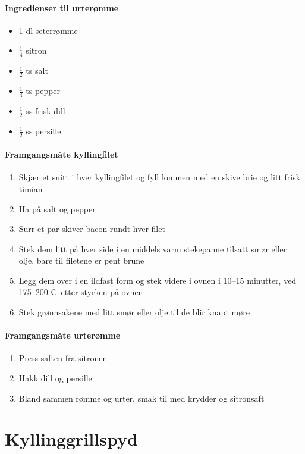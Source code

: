 \documentclass[12pt,a4paper]{book}
\begin{document}
\paragraph{Ingredienser til urterømme}
\begin{itemize}[noitemsep]
	\item 1 dl seterrømme
	\item $\frac{1}{4}$  sitron
	\item $\frac{1}{2}$  ts salt
	\item $\frac{1}{4}$  ts pepper
	\item $\frac{1}{2}$  ss frisk dill
	\item $\frac{1}{2}$  ss persille
\end{itemize}

\paragraph{Framgangsmåte kyllingfilet}
\begin{enumerate}[noitemsep]
	\item Skjær et snitt i hver kyllingfilet og fyll lommen med en skive brie og litt frisk timian
	\item Ha på salt og pepper
	\item Surr et par skiver bacon rundt hver filet
	\item Stek dem litt på hver side i en middels varm stekepanne tilsatt smør eller olje, bare til filetene er pent brune
	\item Legg dem over i en ildfast form og stek videre i ovnen i 10--15 minutter, ved 175--200 \degree C--etter styrken på ovnen
	\item Stek grønnsakene med litt smør eller olje til de blir knapt møre
\end{enumerate}


\paragraph{Framgangsmåte urterømme}
\begin{enumerate}[noitemsep]
	\item Press saften fra sitronen
	\item Hakk dill og persille
	\item Bland sammen rømme og urter, smak til med krydder og sitronsaft
\end{enumerate}
\clearpage{}
\clearpage{}\section{﻿Kyllinggrillspyd}
\end{document}
